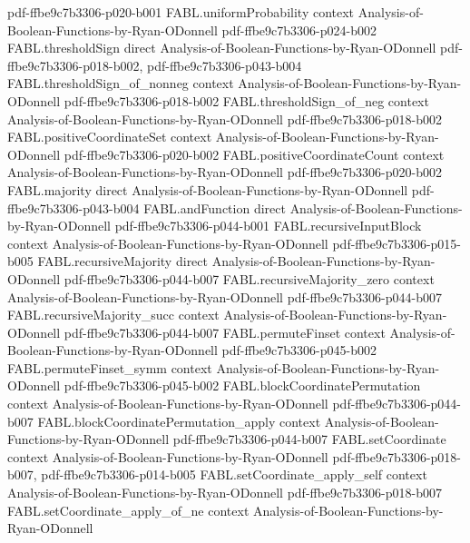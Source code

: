 \begin{theorem}
  {pdf-ffbe9c7b3306-p020-b001}
\proofstep
  {FABL.uniformProbability}
  {context}
  {Analysis-of-Boolean-Functions-by-Ryan-ODonnell}
  {pdf-ffbe9c7b3306-p024-b002}
\proofstep
  {FABL.thresholdSign}
  {direct}
  {Analysis-of-Boolean-Functions-by-Ryan-ODonnell}
  {pdf-ffbe9c7b3306-p018-b002,
    pdf-ffbe9c7b3306-p043-b004}
\proofstep
  {FABL.thresholdSign_of_nonneg}
  {context}
  {Analysis-of-Boolean-Functions-by-Ryan-ODonnell}
  {pdf-ffbe9c7b3306-p018-b002}
\proofstep
  {FABL.thresholdSign_of_neg}
  {context}
  {Analysis-of-Boolean-Functions-by-Ryan-ODonnell}
  {pdf-ffbe9c7b3306-p018-b002}
\proofstep
  {FABL.positiveCoordinateSet}
  {context}
  {Analysis-of-Boolean-Functions-by-Ryan-ODonnell}
  {pdf-ffbe9c7b3306-p020-b002}
\proofstep
  {FABL.positiveCoordinateCount}
  {context}
  {Analysis-of-Boolean-Functions-by-Ryan-ODonnell}
  {pdf-ffbe9c7b3306-p020-b002}
\proofstep
  {FABL.majority}
  {direct}
  {Analysis-of-Boolean-Functions-by-Ryan-ODonnell}
  {pdf-ffbe9c7b3306-p043-b004}
\proofstep
  {FABL.andFunction}
  {direct}
  {Analysis-of-Boolean-Functions-by-Ryan-ODonnell}
  {pdf-ffbe9c7b3306-p044-b001}
\proofstep
  {FABL.recursiveInputBlock}
  {context}
  {Analysis-of-Boolean-Functions-by-Ryan-ODonnell}
  {pdf-ffbe9c7b3306-p015-b005}
\proofstep
  {FABL.recursiveMajority}
  {direct}
  {Analysis-of-Boolean-Functions-by-Ryan-ODonnell}
  {pdf-ffbe9c7b3306-p044-b007}
\proofstep
  {FABL.recursiveMajority_zero}
  {context}
  {Analysis-of-Boolean-Functions-by-Ryan-ODonnell}
  {pdf-ffbe9c7b3306-p044-b007}
\proofstep
  {FABL.recursiveMajority_succ}
  {context}
  {Analysis-of-Boolean-Functions-by-Ryan-ODonnell}
  {pdf-ffbe9c7b3306-p044-b007}
\proofstep
  {FABL.permuteFinset}
  {context}
  {Analysis-of-Boolean-Functions-by-Ryan-ODonnell}
  {pdf-ffbe9c7b3306-p045-b002}
\proofstep
  {FABL.permuteFinset_symm}
  {context}
  {Analysis-of-Boolean-Functions-by-Ryan-ODonnell}
  {pdf-ffbe9c7b3306-p045-b002}
\proofstep
  {FABL.blockCoordinatePermutation}
  {context}
  {Analysis-of-Boolean-Functions-by-Ryan-ODonnell}
  {pdf-ffbe9c7b3306-p044-b007}
\proofstep
  {FABL.blockCoordinatePermutation_apply}
  {context}
  {Analysis-of-Boolean-Functions-by-Ryan-ODonnell}
  {pdf-ffbe9c7b3306-p044-b007}
\proofstep
  {FABL.setCoordinate}
  {context}
  {Analysis-of-Boolean-Functions-by-Ryan-ODonnell}
  {pdf-ffbe9c7b3306-p018-b007,
    pdf-ffbe9c7b3306-p014-b005}
\proofstep
  {FABL.setCoordinate_apply_self}
  {context}
  {Analysis-of-Boolean-Functions-by-Ryan-ODonnell}
  {pdf-ffbe9c7b3306-p018-b007}
\proofstep
  {FABL.setCoordinate_apply_of_ne}
  {context}
  {Analysis-of-Boolean-Functions-by-Ryan-ODonnell}

\end{theorem}

